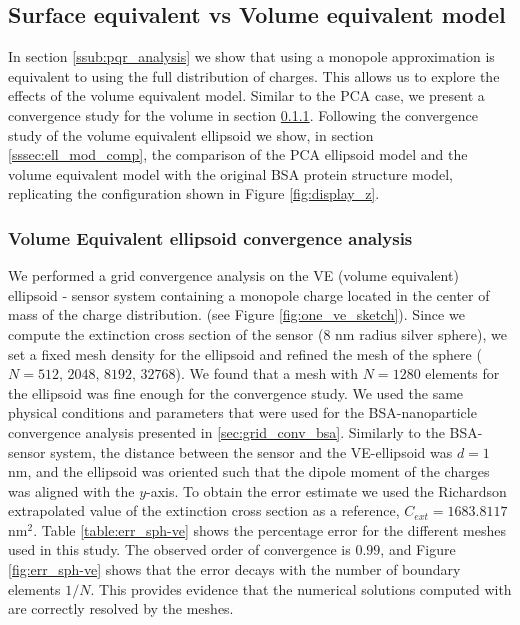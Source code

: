 \subsection{Surface equivalent vs Volume equivalent model} \label{ssec:surf_vol_ell}

In section \ref{ssub:pqr_analysis} we show that using a monopole approximation is equivalent to using the full distribution of charges. This 
allows us to explore the effects of the volume equivalent model. Similar to the PCA case, we present a convergence study for the volume in section \ref{sssec:ve_conv}. 
Following the convergence study of the volume equivalent ellipsoid we show, in section \ref{sssec:ell_mod_comp}, the comparison of the PCA ellipsoid model and the volume equivalent 
model with the original BSA protein structure model, replicating the configuration shown in Figure \ref{fig:display_z}. 

\subsubsection{Volume Equivalent ellipsoid convergence analysis}\label{sssec:ve_conv}

We performed a grid convergence analysis on the VE (volume equivalent) ellipsoid - sensor system containing a monopole charge located 
in the center of mass of the charge distribution. (see Figure \ref{fig:one_ve_sketch}). Since we compute the extinction cross section of the sensor 
(8 nm radius silver sphere), we set a fixed mesh density for the ellipsoid and refined 
the mesh of the sphere ($N=512,\,  2048,\, 8192,\, 32768$). We found that a mesh with $N=1280$ elements for the ellipsoid was fine enough for the convergence study.
We used the same physical conditions and parameters that were used for the BSA-nanoparticle convergence analysis presented in
\ref{sec:grid_conv_bsa}. Similarly to the BSA-sensor system, the distance between the sensor and the VE-ellipsoid 
was $d=1$ nm, and the ellipsoid was oriented such that the dipole moment of the charges was aligned with the $y$-axis. To obtain the error 
estimate we used the Richardson extrapolated value of the extinction cross section as a reference, $C_{ext} = 1683.8117$ nm$^2$. Table \ref{table:err_sph-ve} shows 
the percentage error for the different meshes used in this study. The observed order of convergence is $0.99$, and Figure \ref{fig:err_sph-ve} shows that the error decays 
with the number of boundary elements $1/N$. This provides evidence that the numerical solutions computed with \pygbe are correctly resolved by the meshes.  

